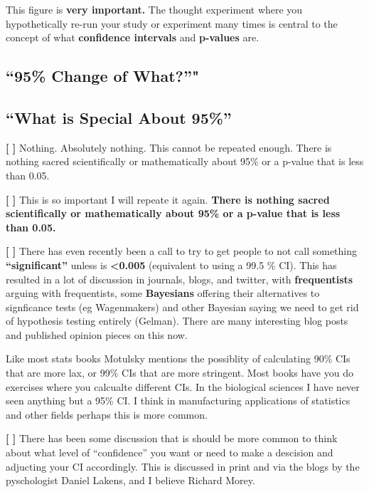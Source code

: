 \documentclass[]{book}
\theoremstyle{definition}
\theoremstyle{definition}
\theoremstyle{definition}
\theoremstyle{remark}
\begin{document}
This figure is \textbf{very important.} The thought experiment where you
hypothetically re-run your study or experiment many times is central to
the concept of what \textbf{confidence intervals} and \textbf{p-values}
are.

\subsection{\texorpdfstring{``95\% Change of
What?''"}{95\% Change of What?"}}\label{change-of-what}

\subsection{\texorpdfstring{``What is Special About
95\%''}{What is Special About 95\%}}\label{what-is-special-about-95}

\textbf{{[} {]}} Nothing. Absolutely nothing. This cannot be repeated
enough. There is nothing sacred scientifically or mathematically about
95\% or a p-value that is less than 0.05.

\textbf{{[} {]}} This is so important I will repeate it again.
\textbf{There is nothing sacred scientifically or mathematically about
95\% or a p-value that is less than 0.05.}

\textbf{{[} {]}} There has even recently been a call to try to get
people to not call something \textbf{``significant''} unless is
\textbf{\textless{}0.005} (equivalent to using a 99.5 \% CI). This has
resulted in a lot of discussion in journals, blogs, and twitter, with
\textbf{frequentists} arguing with frequentists, some \textbf{Bayesians}
offering their alternatives to signficance tests (eg Wagenmakers) and
other Bayesian saying we need to get rid of hypothesis testing entirely
(Gelman). There are many interesting blog posts and published opinion
pieces on this now.

Like most stats books Motulsky mentions the possiblity of calculating
90\% CIs that are more lax, or 99\% CIs that are more stringent. Most
books have you do exercises where you calcualte different CIs. In the
biological sciences I have never seen anything but a 95\% CI. I think in
manufacturing applications of statistics and other fields perhaps this
is more common.

\textbf{{[} {]}} There has been some discussion that is should be more
common to think about what level of ``confidence'' you want or need to
make a descision and adjucting your CI accordingly. This is discussed in
print and via the blogs by the pyschologist Daniel Lakens, and I believe
Richard Morey.
\end{document}
